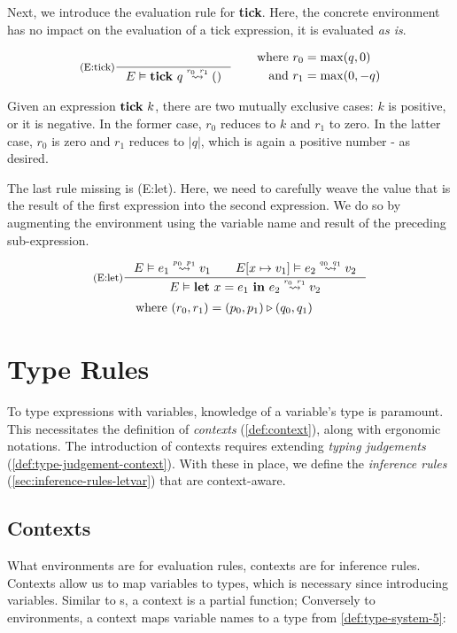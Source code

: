 Next, we introduce the evaluation rule for \textbf{tick}. Here, the concrete environment has no impact on the evaluation of a tick expression, it is evaluated \emph{as is}. 

\[
   \inference[(E:tick)]
   {}
   {\evals{E}{\tick{q}}{()}{r_0}{r_1}}%
   \qquad 
   \begin{aligned}
      \text{where }  &r_0 = \max(q, 0)\\
      \text{and }    &r_1 = \max(0, -q) 
   \end{aligned}
\]

Given an expression \(\mathbf{tick}~k\), there are two mutually exclusive cases: \(k\) is positive, or it is negative. In the former case, \(r_0\) reduces to \(k\) and \(r_1\) to zero. In the latter case, \(r_0\) is zero and \(r_1\) reduces to \(|q|\), which is again a positive number - as desired. 

The last rule missing is (E:let). Here, we need to carefully weave the value that is the result of the first expression into the second expression. We do so by augmenting the environment using the variable name and result of the preceding sub-expression.

\[
   \inference[(E:let)]
   {\evals{E}{e_1}{v_1}{p_0}{p_1} \qquad \evals{\envaugment{E}{x}{v_1}}{e_2}{v_2}{q_0}{q_1}}
   {\evals{E}{\letexp{x}{e_1}{e_2}}{v_2}{r_0}{r_1}}%
\]
\begin{align*}
   \text{where }  &(r_0, r_1) = (p_0, p_1) \triangleright (q_0, q_1)
\end{align*}


\section{Type Rules}\label{sec:type-rules-5}

To type expressions with variables, knowledge of a variable's type is paramount. This necessitates the definition of \emph{contexts} (\cref{def:context}), along with ergonomic notations. The introduction of contexts requires extending \emph{typing judgements} (\cref{def:type-judgement-context}). With these in place, we define the \emph{inference rules} (\cref{sec:inference-rules-letvar}) that are context-aware.

\subsection{Contexts}

What environments are for evaluation rules, contexts are for inference rules. Contexts allow us to map variables to types, which is necessary since introducing variables. Similar to s, a context is a partial function; Conversely to environments, a context maps variable names to a type from \cref{def:type-system-5}:


